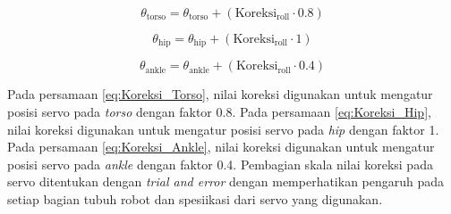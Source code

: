 \begin{enumerate}[label=\Alph*.]
    \begin{equation}
      \theta_{\mathrm{torso}} = \theta_{\mathrm{torso}} + (\mathrm{Koreksi}_{\mathrm{roll}} \cdot 0.8)
      \label{eq:Koreksi_Torso}
    \end{equation}
    
    \begin{equation}
      \theta_{\mathrm{hip}} = \theta_{\mathrm{hip}} + (\mathrm{Koreksi}_{\mathrm{roll}} \cdot 1)
      \label{eq:Koreksi_Hip}
    \end{equation}
    
    \begin{equation}
      \theta_{\mathrm{ankle}} = \theta_{\mathrm{ankle}} + (\mathrm{Koreksi}_{\mathrm{roll}} \cdot 0.4)
      \label{eq:Koreksi_Ankle}
    \end{equation}
    
    \hspace*{1em} Pada persamaan \ref{eq:Koreksi_Torso}, nilai koreksi digunakan untuk mengatur posisi servo pada \textit{torso} dengan faktor 0.8. Pada persamaan \ref{eq:Koreksi_Hip}, nilai koreksi digunakan untuk mengatur posisi servo pada \textit{hip} dengan faktor 1. Pada persamaan \ref{eq:Koreksi_Ankle}, nilai koreksi digunakan untuk mengatur posisi servo pada \textit{ankle} dengan faktor 0.4.  Pembagian skala nilai koreksi pada servo ditentukan dengan \textit{trial and error} dengan memperhatikan pengaruh pada setiap bagian tubuh robot dan spesiikasi dari servo yang digunakan.

    \hspace*{1em} 
\end{enumerate}